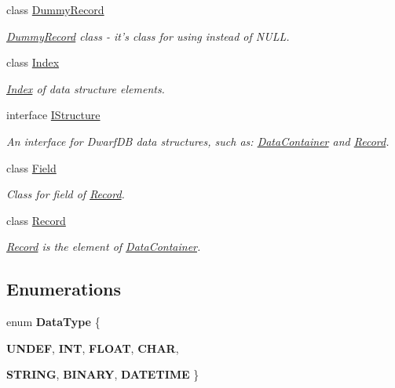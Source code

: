 \begin{DoxyCompactItemize}
class \hyperlink{class_dwarf_d_b_1_1_data_structures_1_1_dummy_record}{DummyRecord}
\begin{DoxyCompactList}\small\item\em \hyperlink{class_dwarf_d_b_1_1_data_structures_1_1_dummy_record}{DummyRecord} class -\/ it's class for using instead of NULL. \item\end{DoxyCompactList}\item 
class \hyperlink{class_dwarf_d_b_1_1_data_structures_1_1_index}{Index}
\begin{DoxyCompactList}\small\item\em \hyperlink{class_dwarf_d_b_1_1_data_structures_1_1_index}{Index} of data structure elements. \item\end{DoxyCompactList}\item 
interface \hyperlink{interface_dwarf_d_b_1_1_data_structures_1_1_i_structure}{IStructure}
\begin{DoxyCompactList}\small\item\em An interface for DwarfDB data structures, such as: \hyperlink{class_dwarf_d_b_1_1_data_structures_1_1_data_container}{DataContainer} and \hyperlink{class_dwarf_d_b_1_1_data_structures_1_1_record}{Record}. \item\end{DoxyCompactList}\item 
class \hyperlink{class_dwarf_d_b_1_1_data_structures_1_1_field}{Field}
\begin{DoxyCompactList}\small\item\em Class for field of \hyperlink{class_dwarf_d_b_1_1_data_structures_1_1_record}{Record}. \item\end{DoxyCompactList}\item 
class \hyperlink{class_dwarf_d_b_1_1_data_structures_1_1_record}{Record}
\begin{DoxyCompactList}\small\item\em \hyperlink{class_dwarf_d_b_1_1_data_structures_1_1_record}{Record} is the element of \hyperlink{class_dwarf_d_b_1_1_data_structures_1_1_data_container}{DataContainer}. \item\end{DoxyCompactList}\end{DoxyCompactItemize}
\subsection*{Enumerations}
\begin{DoxyCompactItemize}
\item 
enum {\bfseries DataType} \{ \par
{\bfseries UNDEF}, 
{\bfseries INT}, 
{\bfseries FLOAT}, 
{\bfseries CHAR}, 
\par
{\bfseries STRING}, 
{\bfseries BINARY}, 
{\bfseries DATETIME}
 \}
\end{DoxyCompactItemize}
